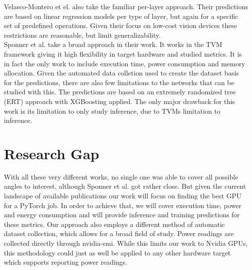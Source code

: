 Velasco-Montero et el. also take the familiar per-layer approach. Their predictions are based on linear
regression models per type of layer, but again for a specific set of predefined operations. Given their 
focus on low-cost vision devices these restrictions are reasonable, but limit generalizability. \\
Sponner et al. take a broad approach in their work. It works in the TVM framework giving it high flexibility
in target hardware and studied metrics. It is in fact the only work to include execution time, power
consumption and memory allocation. Given the automated data colletion used to create the dataset basis
for the predictions, there are also few limitations to the networks that can be studied with this. 
The predictions are based on an extremely randomized tree (ERT) approach with XGBoosting applied. The 
only major drawback for this work is its limitation to only study inference, due to TVMs limitation to inference.



\section{Research Gap}
With all these very different works, no single one was able to cover all possible angles to interest,
although Sponner et al. got rather close. But given the current landscape of available publications
our work will focus on finding the best GPU for a PyTorch job. In order to achieve that, we will cover
execution time, power and energy consumption and will provide inference and training predictions for these
metrics. Our approach also employs a different method of automatic dataset collection, which allows
for a broad field of study. Power readings are collected directly through nvidia-smi.
While this limits our work to Nvidia GPUs, this methodology could just as well be applied to any other hardware target which supports reporting power readings.
